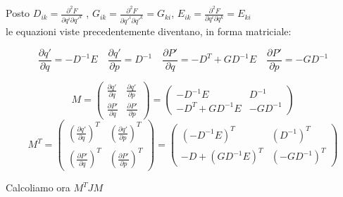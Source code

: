 Posto $ D_{ik} = \frac{\partial^2 F}{\partial q^i \partial q'^k} $ , $ G_{ik} = \frac{\partial^2 F}{\partial q'^i \partial q'^k} = G_{ki} $, $ E_{ik} = \frac{\partial^2 F}{\partial q^i \partial q^k} = E_{ki} $ \\

le equazioni viste precedentemente diventano, in forma matriciale:

\begin{equation*}
\frac{\partial q'}{\partial q} = - D^{-1} E \quad \frac{\partial q'}{\partial p} = D^{-1} \quad \frac{\partial P'}{\partial q} = - D^{T} + GD^{-1} E \quad \frac{\partial P'}{\partial p} = - G D^{-1}
\end{equation*}

\begin{equation*}
M = \left( \begin{array}{cc}
\frac{\partial q'}{\partial q} & \frac{\partial q'}{\partial p} \\ 
\frac{\partial P'}{\partial q} & \frac{\partial P'}{\partial p}
\end{array} \right) = \left( \begin{array}{cc}
- D^{-1} E & D^{-1} \\ 
- D^{T} + GD^{-1} E & - G D^{-1}
\end{array} \right) 
\end{equation*}
\begin{equation*}
M^{T} = \left( \begin{array}{cc}
\left( \frac{\partial q'}{\partial q} \right)^{T} & \left( \frac{\partial q'}{\partial p} \right)^{T} \\ 
\left( \frac{\partial P'}{\partial q} \right)^{T} & \left( \frac{\partial P'}{\partial p} \right)^{T}
\end{array} \right) = \left( \begin{array}{cc}
(-D^{-1} E)^{T} & (D^{-1})^{T} \\ 
-D + (GD^{-1}E)^{T}  & (-G D^{-1})^{T}
\end{array} \right)
\end{equation*}

Calcoliamo ora $ M^{T} J M $

